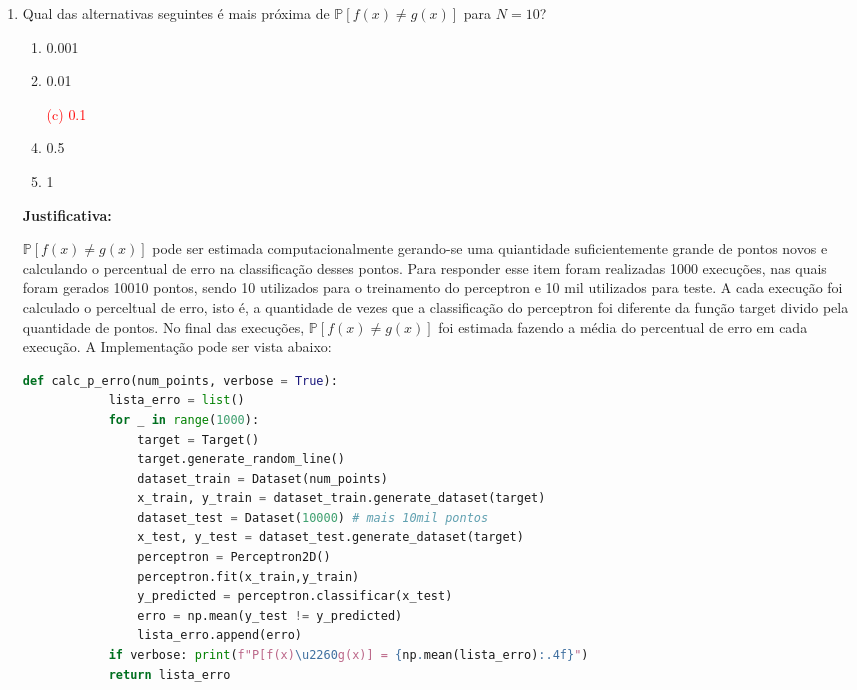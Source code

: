 \begin{enumerate}
    \item Qual das alternativas seguintes é mais próxima de $\mathbb{P}[f(x) \neq g(x)]$ para $N = 10$?
    
    \begin{enumerate}
        \item 0.001
        \item 0.01
        \item[\textcolor{red}{(c)}]\textcolor{red}{0.1}\addtocounter{enumii}{1}
        \item 0.5
        \item 1
    \end{enumerate}
     
    \par

    \textbf{Justificativa:}
     
    $\mathbb{P}[f(x) \neq g(x)]$ pode ser estimada computacionalmente gerando-se uma quiantidade suficientemente grande de pontos novos e calculando o percentual de erro na classificação desses pontos. Para responder esse item foram realizadas 1000 execuções, nas quais foram gerados 10010 pontos, sendo 10 utilizados para o treinamento do perceptron e 10 mil utilizados para teste. A cada execução foi calculado o perceltual de erro, isto é, a quantidade de vezes que a classificação do perceptron foi diferente da função target divido pela quantidade de pontos. No final das execuções, $\mathbb{P}[f(x) \neq g(x)]$ foi estimada fazendo a média do percentual de erro em cada execução. A Implementação pode ser vista abaixo:

    \begin{lstlisting}[language=Python, caption=Cálculo da probabilidade de erro, label=cod:perceptron_p_erro]
        def calc_p_erro(num_points, verbose = True):
            lista_erro = list()
            for _ in range(1000):
                target = Target()
                target.generate_random_line()
                dataset_train = Dataset(num_points)
                x_train, y_train = dataset_train.generate_dataset(target)
                dataset_test = Dataset(10000) # mais 10mil pontos
                x_test, y_test = dataset_test.generate_dataset(target)
                perceptron = Perceptron2D()
                perceptron.fit(x_train,y_train)
                y_predicted = perceptron.classificar(x_test)
                erro = np.mean(y_test != y_predicted)
                lista_erro.append(erro)
            if verbose: print(f"P[f(x)\u2260g(x)] = {np.mean(lista_erro):.4f}")
            return lista_erro
    \end{lstlisting}


\end{enumerate}
